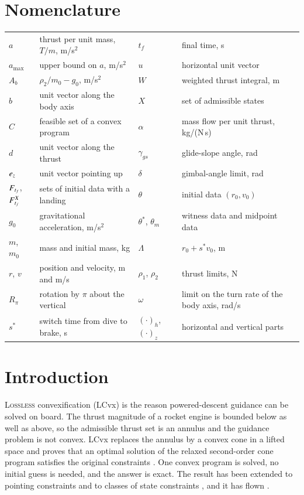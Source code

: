 \section{Nomenclature}
{\renewcommand{\arraystretch}{1.0}\noindent
\begin{tabular}{@{}l@{\ \,=\ \,}l@{\hspace{0.2in}}l@{\ \,=\ \,}l@{}}
$a$ & thrust per unit mass, $T/m$, m/s$^2$ & $t_f$ & final time, s \\
$a_{\max}$ & upper bound on $a$, m/s$^2$ & $u$ & horizontal unit vector \\
$A_b$ & $\rho_2/m_0-g_0$, m/s$^2$ & $W$ & weighted thrust integral, m \\
$b$ & unit vector along the body axis & $X$ & set of admissible states \\
$C$ & feasible set of a convex program & $\alpha$ & mass flow per unit thrust, kg/(N\,s) \\
$d$ & unit vector along the thrust & $\gamma_{gs}$ & glide-slope angle, rad \\
$e_z$ & unit vector pointing up & $\delta$ & gimbal-angle limit, rad \\
$F_{t_f}$, $F^{X}_{t_f}$ & sets of initial data with a landing & $\theta$ & initial data $(r_0,v_0)$ \\
$g_0$ & gravitational acceleration, m/s$^2$ & $\theta^*$, $\theta_m$ & witness data and midpoint data \\
$m$, $m_0$ & mass and initial mass, kg & $\Lambda$ & $r_0+s^*v_0$, m \\
$r$, $v$ & position and velocity, m and m/s & $\rho_1$, $\rho_2$ & thrust limits, N \\
$R_\pi$ & rotation by $\pi$ about the vertical & $\omega$ & limit on the turn rate of the body axis, rad/s \\
$s^*$ & switch time from dive to brake, s & $(\cdot)_h$, $(\cdot)_z$ & horizontal and vertical parts \\
\end{tabular}}

\section{Introduction}
\lettrine{L}{ossless} convexification (LCvx) is the reason powered-descent guidance can be solved on board. The thrust
magnitude of a rocket engine is bounded below as well as above, so the admissible thrust set is an annulus and the guidance
problem is not convex. LCvx replaces the annulus by a convex cone in a lifted space and proves that an optimal solution of
the relaxed second-order cone program satisfies the original constraints
\cite{acikmese2007,blackmore2010,acikmese2011,acikmese2013}. One convex program is solved, no initial guess is needed, and
the answer is exact. The result has been extended to pointing constraints and to classes of state constraints
\cite{acikmese2013,harris2014}, and it has flown \cite{malyuta2022}.

